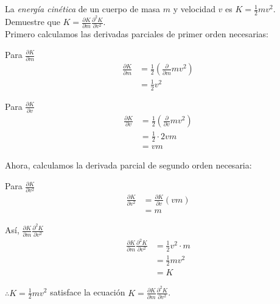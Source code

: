 \documentclass[12pt]{article}
\begin{document}
\section{}

La \textit{energía cinética} de un cuerpo de masa $m$ y velocidad $v$ es $K = \frac{1}{2}mv^2$. Demuestre que $K=\frac{\partial K}{\partial m} \frac{\partial ^2 K}{\partial v^2}$. \\

Primero calculamos las derivadas parciales de primer orden necesarias:

Para $\frac{\partial K}{\partial m}$
\begin{align*}
  \frac{\partial K}{\partial m}
  &= \frac{1}{2} \left(\frac{\partial}{\partial m}mv^2 \right) \\
  &= \frac{1}{2} v^2
\end{align*}

Para $\frac{\partial K}{\partial v}$
\begin{align*}
  \frac{\partial K}{\partial v}
  &= \frac{1}{2} \left(\frac{\partial}{\partial v}mv^2 \right) \\
  &= \frac{1}{2} \cdot 2vm \\
  &= vm
\end{align*}

Ahora, calculamos la derivada parcial de segundo orden necesaria:

Para $\frac{\partial K}{\partial v^2}$
\begin{align*}
  \frac{\partial K}{\partial v^2}
  &= \frac{\partial K}{\partial v} \left( vm \right) \\
  &= m
\end{align*}

Así, $\frac{\partial K}{\partial m} \frac{\partial ^2 K}{\partial v^2}$
\begin{align*}
  \frac{\partial K}{\partial m} \frac{\partial ^2 K}{\partial v^2}
  &= \frac{1}{2} v^2 \cdot m \\
  &= \frac{1}{2} mv^2 \\
  &= K
\end{align*}

$\therefore K=\frac{1}{2} mv^2$ satisface la ecuación $K=\frac{\partial K}{\partial m} \frac{\partial ^2 K}{\partial v^2}$.

\section{}
\end{document}
